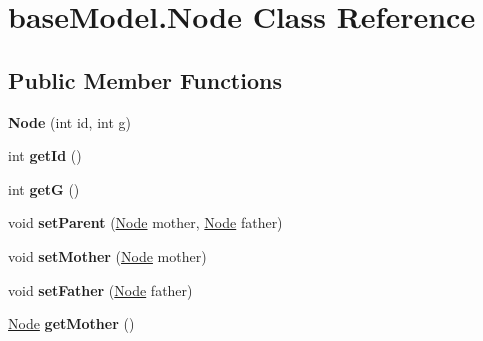 \hypertarget{classbase_model_1_1_node}{}\section{base\+Model.\+Node Class Reference}
\label{classbase_model_1_1_node}
\subsection*{Public Member Functions}
\begin{DoxyCompactItemize}
\item 
\hypertarget{classbase_model_1_1_node_a83777618cfeb85e183a2d1df752ff1b7}{}{\bfseries Node} (int id, int g)\label{classbase_model_1_1_node_a83777618cfeb85e183a2d1df752ff1b7}

\item 
\hypertarget{classbase_model_1_1_node_ab197399cbe00dd0f46a80ed613878061}{}int {\bfseries get\+Id} ()\label{classbase_model_1_1_node_ab197399cbe00dd0f46a80ed613878061}

\item 
\hypertarget{classbase_model_1_1_node_a8108e36e67322bd002a923957b205590}{}int {\bfseries get\+G} ()\label{classbase_model_1_1_node_a8108e36e67322bd002a923957b205590}

\item 
\hypertarget{classbase_model_1_1_node_a174842f4f30adb96b7f3d20179714e2e}{}void {\bfseries set\+Parent} (\hyperlink{classbase_model_1_1_node}{Node} mother, \hyperlink{classbase_model_1_1_node}{Node} father)\label{classbase_model_1_1_node_a174842f4f30adb96b7f3d20179714e2e}

\item 
\hypertarget{classbase_model_1_1_node_afba2c0dc83c1e20b13cce61f366b5fe1}{}void {\bfseries set\+Mother} (\hyperlink{classbase_model_1_1_node}{Node} mother)\label{classbase_model_1_1_node_afba2c0dc83c1e20b13cce61f366b5fe1}

\item 
\hypertarget{classbase_model_1_1_node_a8702484194b6f41f6dca9c12c18589a5}{}void {\bfseries set\+Father} (\hyperlink{classbase_model_1_1_node}{Node} father)\label{classbase_model_1_1_node_a8702484194b6f41f6dca9c12c18589a5}

\item 
\hypertarget{classbase_model_1_1_node_ace16f2ca384bcf4dca469320103a83a9}{}\hyperlink{classbase_model_1_1_node}{Node} {\bfseries get\+Mother} ()\label{classbase_model_1_1_node_ace16f2ca384bcf4dca469320103a83a9}


\end{DoxyCompactItemize}
